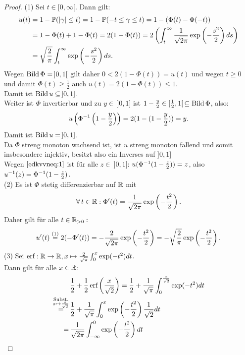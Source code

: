 \begin{proof}
(1) Sei $t \in [0, \infty[$. Dann gilt:
\begin{align*}
u(t) &= 1 - \mathbb{P}(\left|\gamma\right| \le t) = 1 - \mathbb{P}(-t \le \gamma \le t)
= 1 - (\Phi(t) - \Phi(-t))\\
&= 1 - \Phi(t) + 1- \Phi(t) = 2(1- \Phi(t)) = 2\left(\int_t^\infty \frac 1 {\sqrt{2 \pi}} \exp\left(- \frac{s^2}2 \right)ds\right)\\
& = \sqrt{\frac 2 \pi}\int_t ^\infty \exp\left(- \frac{s^2}2 \right)ds\text.
\end{align*}
Wegen $\Bild \Phi = \!\ ]0,1[$ gilt daher $0 < 2(1-\Phi(t)) = u(t)$ und 
wegen $t \ge 0$ und damit $\Phi(t) \ge \frac 1 2$ auch
$u(t) = 2(1-\Phi(t)) \le 1$.\\
Damit ist $\mathop{\textrm{Bild}}\nolimits u \subseteq \!\ ]0, 1]$.\\
Weiter ist $\Phi$ invertierbar und zu $y \in\!\  ]0,1]$ ist 
$1 - \frac y 2 \in [\frac 1 2, 1[\, \subseteq \mathop{\textrm{Bild}}\nolimits \Phi$, also:
\begin{align}
u\left(\Phi^{-1}\left(1- \frac y 2 \right) \right) = 2(1-(1-\frac y 2))=y\text.
\label{edkvvneq:1}
\end{align}
Damit ist $\mathop{\textrm{Bild}}\nolimits u =\!\  ]0,1]$.\\
Da $\Phi$ streng monoton wachsend ist, ist $u$ streng monoton fallend und somit
insbesondere injektiv, besitzt also ein Inverses auf $]0,1]$\\
Wegen $\eqref{edkvvneq:1}$ ist für alle $z\in\!\ ]0,1]$: 
$u(\Phi^{-1}(1-\frac z2))=z$, also $u^{-1}(z) = \Phi^{-1}(1- \frac z 2)$.\\
(2) Es ist $\Phi$ stetig differenzierbar auf $\mathbb{R}$ mit
\[\forall\,t\in\mathbb{R}:\Phi'(t)=\frac 1{\sqrt{2\pi}}\exp\left(-\frac{t^2}2
 \right)\text.\]
Daher gilt für alle $t \in \mathbb{R}_{>0}:$
\[u'(t)\overset{(1)}= 2(-\Phi'(t))=-\frac 2{\sqrt{2\pi}}\exp\left(-\frac{t^2}2
\right)=-\sqrt{\frac 2 \pi}\exp\left(-\frac{t^2}2 \right)\text.\]
(3) Sei $\mathop{\textrm{erf}}\nolimits: \mathbb{R} \rightarrow \mathbb{R},
x \mapsto \frac 2 {\sqrt \pi}\int_0^x\exp(-t^2)dt$.\\
Dann gilt für alle $x \in \mathbb{R}$:
\begin{align*}
&\, \frac 1 2 + \frac 1 2 \erf\left(\frac x {\sqrt 2} \right)
= \frac 1 2 + \frac 1 {\sqrt \pi}\int_0^{\frac x {\sqrt 2}}\exp(-t^2)dt\\
\overset{\substack{\text{Subst.}\\ s \mapsto \frac s{\sqrt 2}}}=&\, \frac 1 2
+\frac 1{\sqrt\pi}\int_0^x \exp\left(- \frac {t^2}2 \right)\frac 1{\sqrt 2}dt\\
=&\, \spi \int_{-\infty}^0 \exp\left(-\frac {t^2}2 \right)dt 

\end{align*}
\end{proof}
